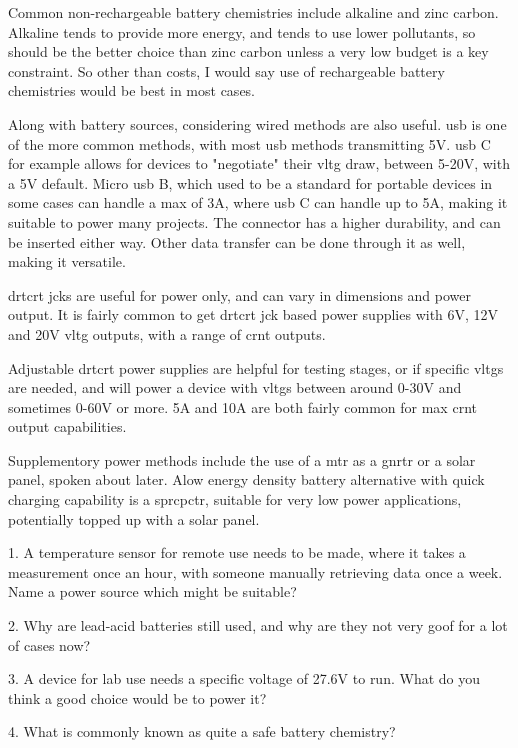 \documentclass[a4paper,11pt]{report}
\newcommand{\Quiz}[1] %
{
\par\noindent %
\phantomsection %
\todo[inline, color=blue!30]{\textbf{#1}} %
\vspace{1em} %
}
\begin{document}
Common non-rechargeable battery chemistries include alkaline and zinc carbon. Alkaline tends to provide more energy, and tends to use lower pollutants, so should be the better choice than zinc carbon unless a very low budget is a key constraint. So other than costs, I would say use of rechargeable battery chemistries would be best in most cases.

Along with battery sources, considering wired methods are also useful. \gls{usb} is one of the more common methods, with most \gls{usb} methods transmitting 5V. \gls{usb} C for example allows for devices to "negotiate" their \gls{vltg} draw, between 5-20V, with a 5V default. Micro \gls{usb} B, which used to be a standard for portable devices in some cases can handle a max of 3A, where \gls{usb} C can handle up to 5A, making it suitable to power many projects. The connector has a higher durability, and can be inserted either way. Other data transfer can be done through it as well, making it versatile.

\gls{drtcrt} \gls{jck}s are useful for power only, and can vary in dimensions and power output. It is fairly common to get \gls{drtcrt} \gls{jck} based power supplies with 6V, 12V and 20V \gls{vltg} outputs, with a range of \gls{crnt} outputs.

Adjustable \gls{drtcrt} power supplies are helpful for testing stages, or if specific \gls{vltg}s are needed, and will power a device with \gls{vltg}s between around 0-30V and sometimes 0-60V or more. 5A and 10A are both fairly common for max \gls{crnt} output capabilities.

Supplementory power methods include the use of a \gls{mtr} as a \gls{gnrtr} or a solar panel, spoken about later. Alow energy density battery alternative with quick charging capability is a \gls{sprcpctr}, suitable for very low power applications, potentially topped up with a solar panel.

\Quiz{Quiz}

1. A temperature sensor for remote use needs to be made, where it takes a measurement once an hour, with someone manually retrieving data once a week. Name a power source which might be suitable?

2. Why are lead-acid batteries still used, and why are they not very goof for a lot of cases now?

3. A device for lab use needs a specific voltage of 27.6V to run. What do you think a good choice would be to power it?

4. What is commonly known as quite a safe battery chemistry?
\end{document}
